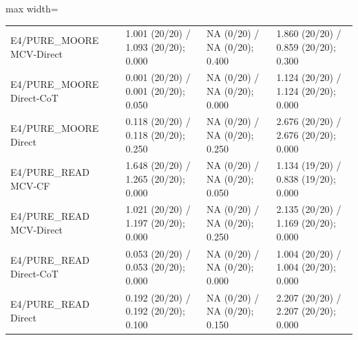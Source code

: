 \documentclass[11pt,a4paper]{article}
\begin{document}
\begin{center}
\begin{adjustbox}{max width=\textwidth}
\begin{tabular}{llll}
E4/PURE\_\allowbreak{}MOORE MCV-Direct & 1.001 (20/20) / 1.093 (20/20); 0.000 & NA (0/20) / NA (0/20); 0.400 & 1.860 (20/20) / 0.859 (20/20); 0.300 \\
E4/PURE\_\allowbreak{}MOORE Direct-CoT & 0.001 (20/20) / 0.001 (20/20); 0.050 & NA (0/20) / NA (0/20); 0.000 & 1.124 (20/20) / 1.124 (20/20); 0.000 \\
E4/PURE\_\allowbreak{}MOORE Direct & 0.118 (20/20) / 0.118 (20/20); 0.250 & NA (0/20) / NA (0/20); 0.250 & 2.676 (20/20) / 2.676 (20/20); 0.000 \\
E4/PURE\_\allowbreak{}READ MCV-CF & 1.648 (20/20) / 1.265 (20/20); 0.000 & NA (0/20) / NA (0/20); 0.050 & 1.134 (19/20) / 0.838 (19/20); 0.000 \\
E4/PURE\_\allowbreak{}READ MCV-Direct & 1.021 (20/20) / 1.197 (20/20); 0.000 & NA (0/20) / NA (0/20); 0.250 & 2.135 (20/20) / 1.169 (20/20); 0.000 \\
E4/PURE\_\allowbreak{}READ Direct-CoT & 0.053 (20/20) / 0.053 (20/20); 0.000 & NA (0/20) / NA (0/20); 0.000 & 1.004 (20/20) / 1.004 (20/20); 0.000 \\
E4/PURE\_\allowbreak{}READ Direct & 0.192 (20/20) / 0.192 (20/20); 0.100 & NA (0/20) / NA (0/20); 0.150 & 2.207 (20/20) / 2.207 (20/20); 0.000 \\
\bottomrule\end{tabular}\end{adjustbox}\endgroup\end{center}
\end{document}
